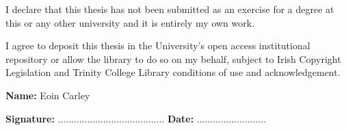 

\begin{declaration}      

I declare that this thesis has not been submitted as an exercise for a degree at this or
any other university and it is entirely my own work.

\vspace{10mm}

I agree to deposit this thesis in the University's open access institutional repository or
allow the library to do so on my behalf, subject to Irish Copyright Legislation and
Trinity College Library conditions of use and acknowledgement.

\vspace{30mm}

\textbf{Name:} Eoin Carley	

\vspace{15mm}

\textbf{Signature:}  ........................................		\textbf{Date:}  ..........................



\end{declaration}

\newpage
\thispagestyle{empty}
\mbox{}



